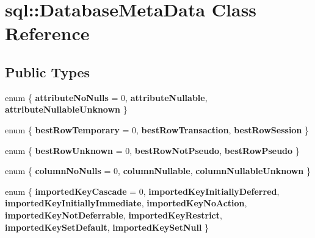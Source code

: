 \hypertarget{classsql_1_1_database_meta_data}{}\section{sql\+:\+:Database\+Meta\+Data Class Reference}
\label{classsql_1_1_database_meta_data}
\subsection*{Public Types}
\begin{DoxyCompactItemize}
\item 
\hypertarget{classsql_1_1_database_meta_data_a0dc3e909654e4349e96328e05c8ab4ea}{}\label{classsql_1_1_database_meta_data_a0dc3e909654e4349e96328e05c8ab4ea} 
enum \{ {\bfseries attribute\+No\+Nulls} = 0, 
{\bfseries attribute\+Nullable}, 
{\bfseries attribute\+Nullable\+Unknown}
 \}
\item 
\hypertarget{classsql_1_1_database_meta_data_ab6ff2a77908ae0a44576dce6e7fa9bd5}{}\label{classsql_1_1_database_meta_data_ab6ff2a77908ae0a44576dce6e7fa9bd5} 
enum \{ {\bfseries best\+Row\+Temporary} = 0, 
{\bfseries best\+Row\+Transaction}, 
{\bfseries best\+Row\+Session}
 \}
\item 
\hypertarget{classsql_1_1_database_meta_data_a4620f13047275aaf7de6a909ccae16c5}{}\label{classsql_1_1_database_meta_data_a4620f13047275aaf7de6a909ccae16c5} 
enum \{ {\bfseries best\+Row\+Unknown} = 0, 
{\bfseries best\+Row\+Not\+Pseudo}, 
{\bfseries best\+Row\+Pseudo}
 \}
\item 
\hypertarget{classsql_1_1_database_meta_data_a69dd286c919dd6dda0a44cd31c36eac5}{}\label{classsql_1_1_database_meta_data_a69dd286c919dd6dda0a44cd31c36eac5} 
enum \{ {\bfseries column\+No\+Nulls} = 0, 
{\bfseries column\+Nullable}, 
{\bfseries column\+Nullable\+Unknown}
 \}
\item 
\hypertarget{classsql_1_1_database_meta_data_a93220e60b60ae6ccdaffda65ff90988d}{}\label{classsql_1_1_database_meta_data_a93220e60b60ae6ccdaffda65ff90988d} 
enum \{ \newline
{\bfseries imported\+Key\+Cascade} = 0, 
{\bfseries imported\+Key\+Initially\+Deferred}, 
{\bfseries imported\+Key\+Initially\+Immediate}, 
{\bfseries imported\+Key\+No\+Action}, 
\newline
{\bfseries imported\+Key\+Not\+Deferrable}, 
{\bfseries imported\+Key\+Restrict}, 
{\bfseries imported\+Key\+Set\+Default}, 
{\bfseries imported\+Key\+Set\+Null}
 \}
\item 

\end{DoxyCompactItemize}
